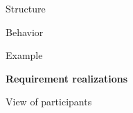 \documentclass[12pt,letterpaper]{article}
\begin{document}

Structure


Behavior


Example



\vspace{1cm}
{\large {\bf Requirement realizations}}
\vspace{0.5cm}



View of participants







\end{document}
